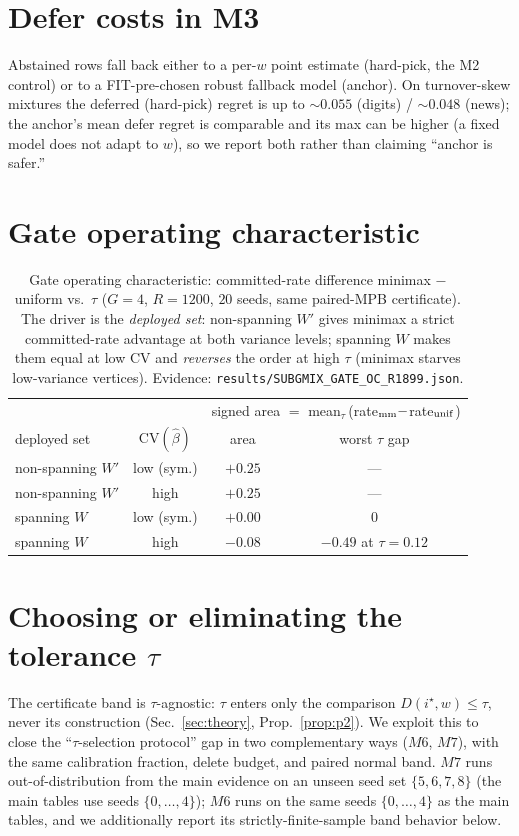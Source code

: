 \documentclass{article}
\begin{document}
\section{Defer costs in M3}
\label{app:m3}
Abstained rows fall back either to a per-$w$ point estimate (hard-pick, the M2 control) or to
a FIT-pre-chosen robust fallback model (anchor). On turnover-skew mixtures the deferred
(hard-pick) regret is up to $\sim0.055$ (digits) / $\sim0.048$ (news); the anchor's mean defer
regret is comparable and its max can be higher (a fixed model does not adapt to $w$), so we
report both rather than claiming ``anchor is safer.''

\section{Gate operating characteristic}
\label{app:gateoc}
\begin{table}[h]
\centering\small\setlength{\tabcolsep}{4pt}
\begin{tabular}{lccc}
\toprule
& & \multicolumn{2}{c}{signed area $=$ mean$_\tau$\,(rate$_{\rm mm}-$rate$_{\rm unif}$)} \\
deployed set & $\mathrm{CV}(\hat\beta)$ & area & worst $\tau$ gap \\
\midrule
non-spanning $W'$ & low (sym.) & $+0.25$ & --- \\
non-spanning $W'$ & high & $+0.25$ & --- \\
spanning $W$ & low (sym.) & $+0.00$ & $0$ \\
spanning $W$ & high & $-0.08$ & $-0.49$ at $\tau{=}0.12$ \\
\bottomrule
\end{tabular}
\caption{Gate operating characteristic: committed-rate difference minimax $-$ uniform vs.\
$\tau$ ($G{=}4$, $R{=}1200$, $20$ seeds, same paired-MPB certificate). The driver is the
\emph{deployed set}: non-spanning $W'$ gives minimax a strict committed-rate advantage at both
variance levels; spanning $W$ makes them equal at low $\mathrm{CV}$ and \emph{reverses} the
order at high $\tau$ (minimax starves low-variance vertices). Evidence:
\texttt{results/SUBGMIX\_GATE\_OC\_R1899.json}.}
\label{tab:gateoc}
\end{table}

\section{Choosing or eliminating the tolerance $\tau$}
\label{app:tau}
The certificate band is $\tau$-agnostic: $\tau$ enters only the comparison
$D(i^\star,w)\le\tau$, never its construction (Sec.~\ref{sec:theory}, Prop.~\ref{prop:p2}).
We exploit this to close the ``$\tau$-selection protocol'' gap in two complementary ways
($M6$, $M7$), with the same calibration fraction, delete budget, and paired normal band.
$M7$ runs out-of-distribution from the main evidence on an unseen seed set
$\{5,6,7,8\}$ (the main tables use seeds $\{0,\dots,4\}$); $M6$ runs on the same seeds
$\{0,\dots,4\}$ as the main tables, and we additionally report its strictly-finite-sample
band behavior below.
\end{document}
